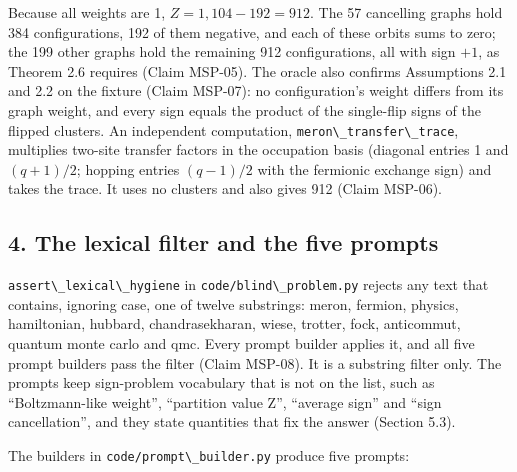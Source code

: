 \documentclass[
  11pt,
]{article}
\newcommand{\passthrough}[1]{#1}
\begin{document}
Because all weights are 1, \(Z = 1{,}104 - 192 = 912\). The 57
cancelling graphs hold 384 configurations, 192 of them negative, and
each of these orbits sums to zero; the 199 other graphs hold the
remaining 912 configurations, all with sign \(+1\), as Theorem 2.6
requires (Claim MSP-05). The oracle also confirms Assumptions 2.1 and
2.2 on the fixture (Claim MSP-07): no configuration's weight differs
from its graph weight, and every sign equals the product of the
single-flip signs of the flipped clusters. An independent computation,
\passthrough{\lstinline!meron\_transfer\_trace!}, multiplies two-site
transfer factors in the occupation basis (diagonal entries 1 and
\((q+1)/2\); hopping entries \((q-1)/2\) with the fermionic exchange
sign) and takes the trace. It uses no clusters and also gives 912 (Claim
MSP-06).

\subsection{4. The lexical filter and the five
prompts}\label{the-lexical-filter-and-the-five-prompts}

\passthrough{\lstinline!assert\_lexical\_hygiene!} in
\passthrough{\lstinline!code/blind\_problem.py!} rejects any text that
contains, ignoring case, one of twelve substrings: meron, fermion,
physics, hamiltonian, hubbard, chandrasekharan, wiese, trotter, fock,
anticommut, quantum monte carlo and qmc. Every prompt builder applies
it, and all five prompt builders pass the filter (Claim MSP-08). It is a
substring filter only. The prompts keep sign-problem vocabulary that is
not on the list, such as ``Boltzmann-like weight'', ``partition value
Z'', ``average sign'' and ``sign cancellation'', and they state
quantities that fix the answer (Section 5.3).

The builders in \passthrough{\lstinline!code/prompt\_builder.py!}
produce five prompts:
\end{document}
